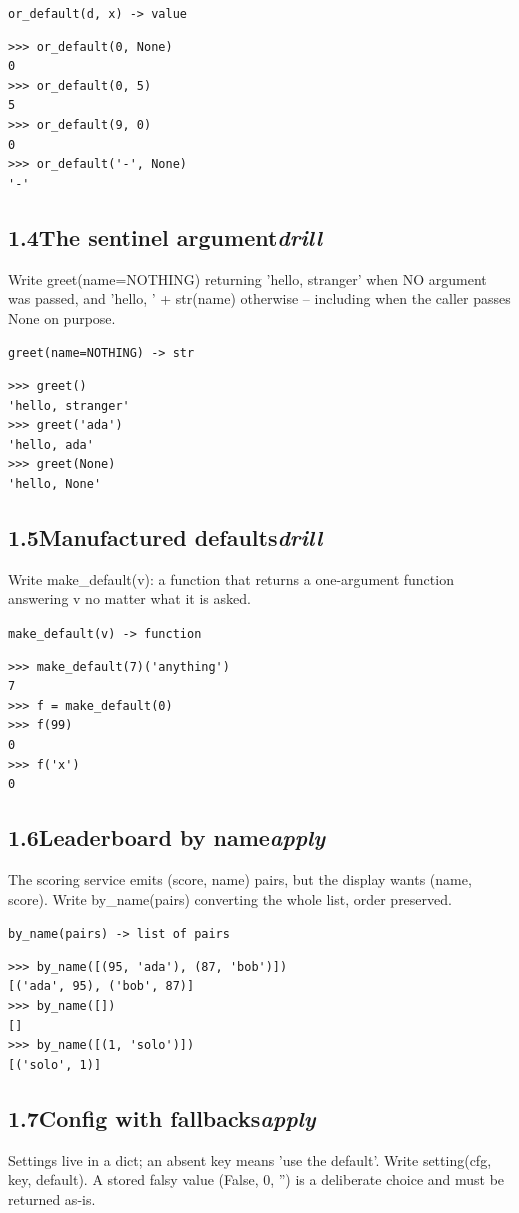 \documentclass[10pt,letterpaper]{book}
\begin{document}
\noindent\texttt{or\_default(d, x) -> value}
\begin{lstlisting}[style=ex]
>>> or_default(0, None)
0
>>> or_default(0, 5)
5
>>> or_default(9, 0)
0
>>> or_default('-', None)
'-'
\end{lstlisting}
\subsection*{1.4\quad The sentinel argument\hfill\textnormal{\textit{drill}}}
Write greet(name=NOTHING) returning 'hello, stranger' when NO argument was passed, and 'hello, ' + str(name) otherwise -- including when the caller passes None on purpose.

\noindent\texttt{greet(name=NOTHING) -> str}
\begin{lstlisting}[style=ex]
>>> greet()
'hello, stranger'
>>> greet('ada')
'hello, ada'
>>> greet(None)
'hello, None'
\end{lstlisting}
\subsection*{1.5\quad Manufactured defaults\hfill\textnormal{\textit{drill}}}
Write make\_default(v): a function that returns a one-argument function answering v no matter what it is asked.

\noindent\texttt{make\_default(v) -> function}
\begin{lstlisting}[style=ex]
>>> make_default(7)('anything')
7
>>> f = make_default(0)
>>> f(99)
0
>>> f('x')
0
\end{lstlisting}

\subsection*{1.6\quad Leaderboard by name\hfill\textnormal{\textit{apply}}}
The scoring service emits (score, name) pairs, but the display wants (name, score). Write by\_name(pairs) converting the whole list, order preserved.

\noindent\texttt{by\_name(pairs) -> list of pairs}
\begin{lstlisting}[style=ex]
>>> by_name([(95, 'ada'), (87, 'bob')])
[('ada', 95), ('bob', 87)]
>>> by_name([])
[]
>>> by_name([(1, 'solo')])
[('solo', 1)]
\end{lstlisting}
\subsection*{1.7\quad Config with fallbacks\hfill\textnormal{\textit{apply}}}
Settings live in a dict; an absent key means 'use the default'. Write setting(cfg, key, default). A stored falsy value (False, 0, '') is a deliberate choice and must be returned as-is.
\end{document}
